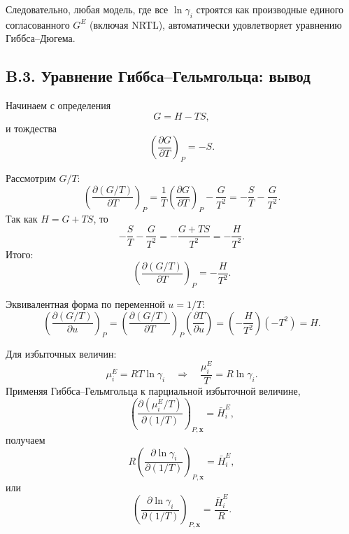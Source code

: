 \documentclass[11pt]{article}
\begin{document}
Следовательно, любая модель, где все $\ln\gamma_i$ строятся как производные единого согласованного $G^E$ (включая NRTL), автоматически удовлетворяет уравнению Гиббса--Дюгема.

\subsection*{B.3. Уравнение Гиббса--Гельмгольца: вывод}

Начинаем с определения
\begin{equation*}
G = H-TS,
\end{equation*}
и тождества
\begin{equation*}
\left(\frac{\partial G}{\partial T}\right)_P=-S.
\end{equation*}

Рассмотрим $G/T$:
\begin{equation*}
\left(\frac{\partial (G/T)}{\partial T}\right)_P
=
\frac{1}{T}\left(\frac{\partial G}{\partial T}\right)_P - \frac{G}{T^2}
=
-\frac{S}{T}-\frac{G}{T^2}.
\end{equation*}
Так как $H=G+TS$, то
\begin{equation*}
-\frac{S}{T}-\frac{G}{T^2}=-\frac{G+TS}{T^2}=-\frac{H}{T^2}.
\end{equation*}
Итого:
\begin{equation*}
\left(\frac{\partial (G/T)}{\partial T}\right)_P=-\frac{H}{T^2}.
\end{equation*}

Эквивалентная форма по переменной $u=1/T$:
\begin{equation*}
\left(\frac{\partial (G/T)}{\partial u}\right)_P
=
\left(\frac{\partial (G/T)}{\partial T}\right)_P\left(\frac{\partial T}{\partial u}\right)
=
\left(-\frac{H}{T^2}\right)(-T^2)=H.
\end{equation*}

Для избыточных величин:
\begin{equation*}
\mu_i^E = RT\ln\gamma_i
\quad\Longrightarrow\quad
\frac{\mu_i^E}{T}=R\ln\gamma_i.
\end{equation*}
Применяя Гиббса--Гельмгольца к парциальной избыточной величине,
\begin{equation*}
\left(\frac{\partial (\mu_i^E/T)}{\partial (1/T)}\right)_{P,\mathbf{x}}=\bar H_i^E,
\end{equation*}
получаем
\begin{equation*}
R\left(\frac{\partial \ln\gamma_i}{\partial (1/T)}\right)_{P,\mathbf{x}}=\bar H_i^E,
\end{equation*}
или
\begin{equation*}
\left(\frac{\partial \ln\gamma_i}{\partial (1/T)}\right)_{P,\mathbf{x}}=\frac{\bar H_i^E}{R}.
\end{equation*}
\end{document}
